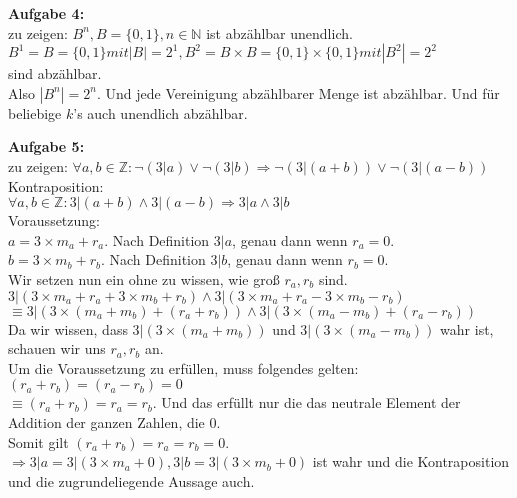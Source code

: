 \documentclass[a4paper]{scrartcl}
\begin{document}
	\begin{flushleft}
		\textbf{Aufgabe 4:}\\
		zu zeigen: $B^n, B=\{0,1\}, n\in \mathbb{N}$ ist abzählbar unendlich.\\[1em]
		$B^1 = B = \{0,1\} mit  |B| = 2^1, B^2 = B\times B = \{0,1\}\times \{0,1\} mit  |B^2| = 2^2$\\ sind abzählbar.\\
		Also $|B^n| = 2^n$. Und jede Vereinigung abzählbarer Menge ist abzählbar. Und für beliebige $k$'s auch unendlich abzählbar.\\		
	\end{flushleft}
	\begin{flushleft}
		\textbf{Aufgabe 5:}\\		
		zu zeigen: $\forall a,b\in \mathbb{Z}: \neg(3|a) \vee \neg(3|b) \Rightarrow \neg(3|(a+b)) \vee \neg(3|(a-b))$\\ 
		Kontraposition:\\
		$\forall a,b\in \mathbb{Z}: 3|(a+b) \wedge 3|(a-b) \Rightarrow 3|a \wedge 3|b$\\[1em]
		Voraussetzung:\\
		$a = 3\times m_a + r_a$. Nach Definition $3|a$, genau dann wenn $r_a = 0$.\\ 
		$b = 3\times m_b + r_b$. Nach Definition $3|b$, genau dann wenn $r_b = 0$.\\[1em]
		Wir setzen nun ein ohne zu wissen, wie groß $r_a,r_b$ sind.\\
		$3|(3\times m_a + r_a + 3\times m_b + r_b) \wedge 3|(3\times m_a + r_a - 3\times m_b - r_b)$\\
		$\equiv 3|(3\times (m_a + m_b) + (r_a + r_b)) \wedge 3|(3\times (m_a - m_b) + (r_a - r_b))$\\
		Da wir wissen, dass $3|(3\times (m_a + m_b))$ und $3|(3\times (m_a - m_b))$ wahr ist, schauen wir uns $r_a,r_b$ an.\\
		Um die Voraussetzung zu erfüllen, muss folgendes gelten: $(r_a + r_b) = (r_a - r_b) = 0$\\
		$\equiv (r_a + r_b) = r_a = r_b$. Und das erfüllt nur die das neutrale Element der Addition der ganzen Zahlen, die $0$.\\
		Somit gilt $(r_a + r_b) = r_a = r_b = 0$.\\
		$\Rightarrow 3|a = 3|(3\times m_a + 0), 3|b = 3|(3\times m_b + 0)$ ist wahr und die Kontraposition und die zugrundeliegende Aussage auch.
		
	\end{flushleft}
\end{document}
